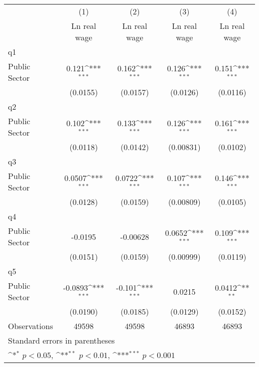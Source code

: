{
\def\sym#1{\ifmmode^{#1}\else\(^{#1}\)\fi}
\begin{tabular}{l*{4}{c}}
\hline\hline
                    &\multicolumn{1}{c}{(1)}&\multicolumn{1}{c}{(2)}&\multicolumn{1}{c}{(3)}&\multicolumn{1}{c}{(4)}\\
                    &\multicolumn{1}{c}{Ln real wage}&\multicolumn{1}{c}{Ln real wage}&\multicolumn{1}{c}{Ln real wage}&\multicolumn{1}{c}{Ln real wage}\\
\hline
q1                  &                     &                     &                     &                     \\
Public Sector       &       0.121\sym{***}&       0.162\sym{***}&       0.126\sym{***}&       0.151\sym{***}\\
                    &    (0.0155)         &    (0.0157)         &    (0.0126)         &    (0.0116)         \\
\hline
q2                  &                     &                     &                     &                     \\
Public Sector       &       0.102\sym{***}&       0.133\sym{***}&       0.126\sym{***}&       0.161\sym{***}\\
                    &    (0.0118)         &    (0.0142)         &   (0.00831)         &    (0.0102)         \\
\hline
q3                  &                     &                     &                     &                     \\
Public Sector       &      0.0507\sym{***}&      0.0722\sym{***}&       0.107\sym{***}&       0.146\sym{***}\\
                    &    (0.0128)         &    (0.0159)         &   (0.00809)         &    (0.0105)         \\
\hline
q4                  &                     &                     &                     &                     \\
Public Sector       &     -0.0195         &    -0.00628         &      0.0652\sym{***}&       0.109\sym{***}\\
                    &    (0.0151)         &    (0.0159)         &   (0.00999)         &    (0.0119)         \\
\hline
q5                  &                     &                     &                     &                     \\
Public Sector       &     -0.0893\sym{***}&      -0.101\sym{***}&      0.0215         &      0.0412\sym{**} \\
                    &    (0.0190)         &    (0.0185)         &    (0.0129)         &    (0.0152)         \\
\hline
Observations        &       49598         &       49598         &       46893         &       46893         \\
\hline\hline
\multicolumn{5}{l}{\footnotesize Standard errors in parentheses}\\
\multicolumn{5}{l}{\footnotesize \sym{*} \(p<0.05\), \sym{**} \(p<0.01\), \sym{***} \(p<0.001\)}\\
\end{tabular}
}
